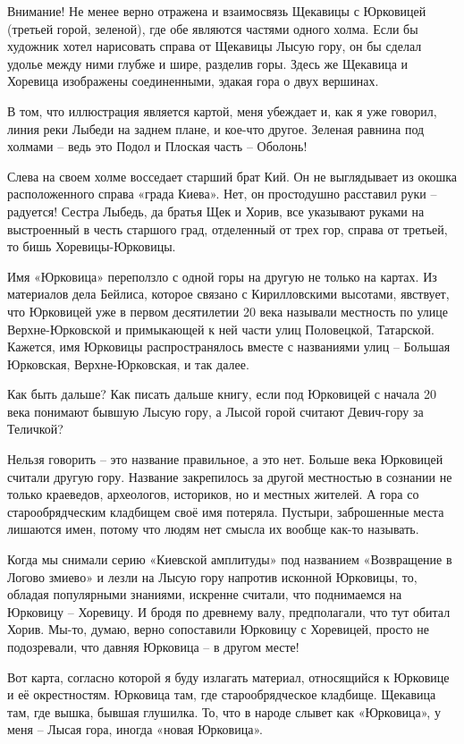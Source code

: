 Внимание! Не менее верно отражена и взаимосвязь Щекавицы с Юрковицей (третьей горой, зеленой), где обе являются частями одного холма. Если бы художник хотел нарисовать справа от Щекавицы Лысую гору, он бы сделал удолье между ними глубже и шире, разделив горы. Здесь же Щекавица и Хоревица изображены соединенными, эдакая гора о двух вершинах.

В том, что иллюстрация является картой, меня убеждает и, как я уже говорил, линия реки Лыбеди на заднем плане, и кое-что другое. Зеленая равнина под холмами – ведь это Подол и Плоская часть – Оболонь!

Слева на своем холме восседает старший брат Кий. Он не выглядывает из окошка расположенного справа «града Киева». Нет, он простодушно расставил руки – радуется! Сестра Лыбедь, да братья Щек и Хорив, все указывают руками на выстроенный в честь старшого град, отделенный от трех гор, справа от третьей, то бишь Хоревицы-Юрковицы.

Имя «Юрковица» переползло с одной горы на другую не только на картах. Из материалов дела Бейлиса, которое связано с Кирилловскими высотами, явствует, что Юрковицей уже в первом десятилетии 20 века называли местность по улице Верхне-Юрковской и примыкающей к ней части улиц Половецкой, Татарской. Кажется, имя Юрковицы распространялось вместе с названиями улиц – Большая Юрковская, Верхне-Юрковская, и так далее.

Как быть дальше? Как писать дальше книгу, если под Юрковицей с начала 20 века понимают бывшую Лысую гору, а Лысой горой считают Девич-гору за Теличкой?

Нельзя говорить – это название правильное, а это нет. Больше века Юрковицей считали другую гору. Название закрепилось за другой местностью в сознании не только краеведов, археологов, историков, но и местных жителей. А гора со старообрядческим кладбищем своё имя потеряла. Пустыри, заброшенные места лишаются имен, потому что людям нет смысла их вообще как-то называть.

Когда мы снимали серию «Киевской амплитуды» под названием «Возвращение в Логово змиево» и лезли на Лысую гору напротив исконной Юрковицы, то, обладая популярными знаниями, искренне считали, что поднимаемся на Юрковицу – Хоревицу. И бродя по древнему валу, предполагали, что тут обитал Хорив. Мы-то, думаю, верно сопоставили Юрковицу с Хоревицей, просто не подозревали, что давняя Юрковица – в другом месте!

Вот карта, согласно которой я буду излагать материал, относящийся к Юрковице и её окрестностям. Юрковица там, где старообрядческое кладбище. Щекавица там, где вышка, бывшая глушилка. То, что в народе слывет как «Юрковица», у меня – Лысая гора, иногда «новая Юрковица».

